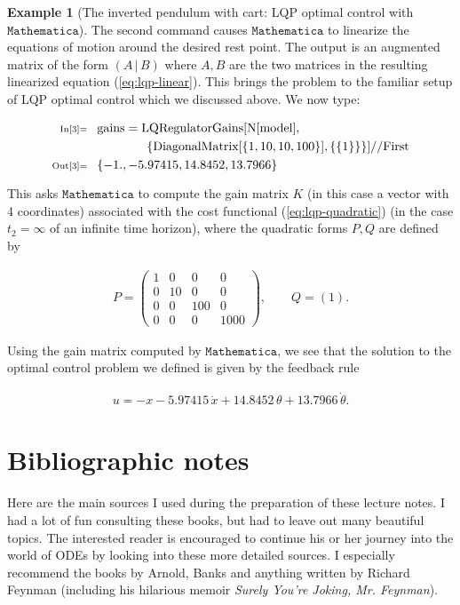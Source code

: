 \documentclass[11pt]{report}
\theoremstyle{plain}
\theoremstyle{definition}
\newtheorem{example}[thm]{Example}
\begin{document}
\begin{example}[The inverted pendulum with cart: LQP optimal control with $\texttt{Mathematica}$]
The second command causes $\texttt{Mathematica}$ to
linearize the equations of motion around the desired
rest point. The output is an augmented matrix of the
form $\left( A\,|\,B\right)$ where $A, B$ are the two
matrices in the resulting linearized equation
(\ref{eq:lqp-linear}). This brings the problem to the
familiar setup of LQP optimal control which we
discussed above. We now type:

\begin{align*}
\scriptsize{\text{In[3]=}}\quad &
\text{gains}=\text{LQRegulatorGains}[\text{N}[\text{model}], \\
& \qquad\qquad
\{\text{DiagonalMatrix}[\{1,10,10,100\}],\{\{1\}\}\}]\text{//}\text{First}
\\
\scriptsize{\text{Out[3]=}}\quad &
\{-1.,-5.97415,14.8452,13.7966\}
\end{align*}

This asks $\texttt{Mathematica}$ to compute the gain
matrix $K$ (in this case a vector with 4 coordinates)
associated with the cost functional
(\ref{eq:lqp-quadratic}) (in the case $t_2=\infty$ of an
infinite time horizon), where the quadratic forms
$P, Q$ are defined by

\begin{align*}
P = \left(\begin{array}{cccc}
1&0&0&0\\0&10&0&0\\0&0&100&0\\0&0&0&1000
\end{array}\right),
\qquad
Q = (1).
\end{align*}

Using the gain matrix computed by
$\texttt{Mathematica}$, we see that the solution to
the optimal control problem we defined is given by the
feedback rule

\begin{align*}
u = - x -5.97415\, \dot{x} + 14.8452\, \theta + 13.7966\, \dot{\theta}.
\end{align*}

\end{example}

\chapter*{Bibliographic notes}
Here are the main sources I used during the preparation of these lecture notes. I had a lot of fun consulting these books, but had to leave out many beautiful topics. The interested reader is encouraged to continue his or her journey into the world of ODEs by looking into these more detailed sources. I especially recommend the books by Arnold, Banks and anything written by Richard Feynman (including his hilarious memoir \emph{Surely You're Joking, Mr. Feynman}).
\end{document}
